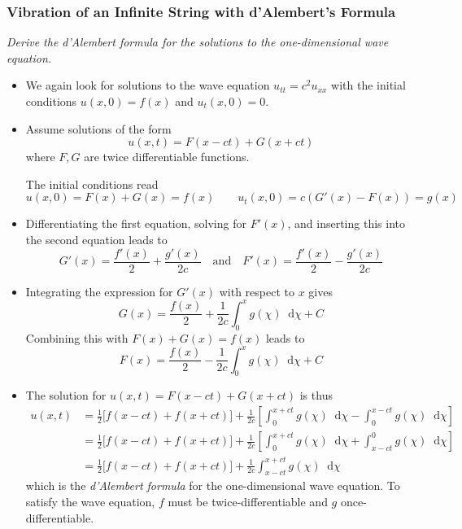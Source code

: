 \documentclass[11pt, a4paper]{article}
\newcommand{\question}[1]{\textit{#1}\vspace{2mm}}
\newcommand{\diff}{\mathop{}\!\mathrm{d}} %
\begin{document}
\subsubsection{Vibration of an Infinite String with d'Alembert's Formula}
\question{Derive the d'Alembert formula for the solutions to the one-dimensional wave equation.}
\begin{itemize}
	\item We again look for solutions to the wave equation $ u_{tt} = c^{2}u_{xx} $ with the initial conditions $ u(x, 0) = f(x) $ and $ u_{t}(x, 0) = 0$. 
	
	\item Assume solutions of the form
	\begin{equation*}
		u(x, t) = F(x - ct) + G(x + ct)
	\end{equation*}	
	where $ F, G $ are twice differentiable functions.
	
	The initial conditions read
	\begin{equation*}
		u(x, 0) = F(x) + G(x) = f(x) \qquad u_{t}(x, 0) = c(G'(x) - F(x)) = g(x)
	\end{equation*}
	
	\item Differentiating the first equation, solving for $ F'(x) $, and inserting this into the second equation leads to
	\begin{equation*}
		G'(x) = \frac{f'(x)}{2} + \frac{g'(x)}{2c} \quad \text{and} \quad F'(x) = \frac{f'(x)}{2} - \frac{g'(x)}{2c}
	\end{equation*}
	
	\item Integrating the expression for $ G'(x) $ with respect to $ x $ gives
	\begin{equation*}
		G(x) = \frac{f(x)}{2} + \frac{1}{2c} \int_{0}^{x} g(\chi)\diff \chi + C
	\end{equation*}
	Combining this with $ F(x) + G(x) = f(x) $ leads to
	\begin{equation*}
		F(x) = \frac{f(x)}{2} - \frac{1}{2c} \int_{0}^{x} g(\chi)\diff \chi + C
	\end{equation*}
	
	\item The solution for $ u(x, t) = F(x - ct) + G(x + ct) $ is thus
	\begin{align*}
		u(x, t) &= \frac{1}{2}\big[ f(x-ct) + f(x + ct)\big] + \frac{1}{2c}\left[\int_{0}^{x+ct}g(\chi)\diff \chi - \int_{0}^{x-ct}g(\chi)\diff \chi \right]\\
		&= \frac{1}{2}\big[ f(x-ct) + f(x + ct)\big] + \frac{1}{2c}\left[\int_{0}^{x+ct}g(\chi)\diff \chi + \int_{x-ct}^{0}g(\chi)\diff \chi \right]\\
		&= \frac{1}{2}\big[ f(x-ct) + f(x + ct)\big] + \frac{1}{2c} \int_{x-ct}^{x+ct}g(\chi)\diff \chi
	\end{align*}
	which is the \textit{d'Alembert formula} for the one-dimensional wave equation. To satisfy the wave equation, $ f $ must be twice-differentiable and $ g $ once-differentiable.
	

\end{itemize}
\end{document}
